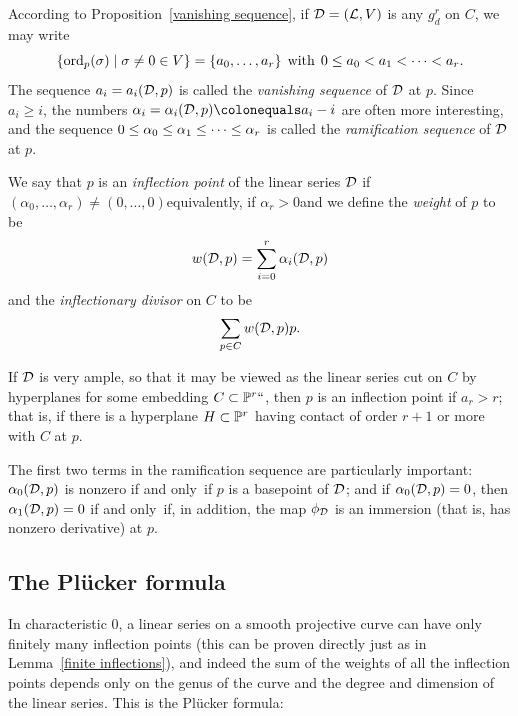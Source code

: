 According to  Proposition~\ref{vanishing sequence}, if ${\mathcal D} = ({\mathcal L}, V)$
is any $g^r_d$ on $C$, we may write
$$
\{ \ord_p(\sigma) \mid \sigma \neq 0 \in V \} = \{a_0,\dots,a_r\} \;
\text{ with } \; 0\leq a_0 < a_1 < \dots < a_r.
$$
The sequence $a_i = a_i({\mathcal D},p)$ is called the
%
\emph{vanishing sequence} of ${\mathcal D}$ at $p$.  Since $a_i \geq i$,
the numbers
$\alpha_i = \alpha_i(\cD,p) \colonequals  a_i - i$ are often more
interesting,
and the sequence $0 \leq \alpha_0 \leq \alpha_1 \leq \dots \leq
\index{ramification sequence|defi}%
\alpha_r$ is called the \emph{ramification sequence} of ${\mathcal D}$ at $p$.

We say that $p$ is an \emph{inflection point} of the linear series ${\mathcal D}$
if $(\alpha_0,\dots,\alpha_r) \neq (0,\dots,0)$\emdash equivalently,
if $\alpha_r > 0$\emdash and we define the \emph{weight} of $p$ to be
%
$$
w({\mathcal D}, p) = \sum_{i=0}^r \alpha_i({\mathcal D}, p)
$$
and the 
\emph{inflectionary divisor}
%
%
 on $C$ to be 
$$
\sum_{p\in C}w({\mathcal D}, p)p.
$$

If ${\mathcal D}$ is very ample, so that it may be viewed as the linear series cut
on $C$ by hyperplanes for some embedding $C \subset \mathbb P^r` `$, then $p$
is an inflection point if $a_r > r$; that is, if there is a hyperplane
$H \subset \mathbb P^r$ having contact of order $r+1$ or more with $C$ at $p$.

The first two terms in the ramification sequence are particularly
important: $\alpha_0({\mathcal D}, p)$ is nonzero if and only~if $p$ is a basepoint
of ${\mathcal D}$; and if $\alpha_0({\mathcal D}, p)=0$, then $\alpha_1({\mathcal D}, p) = 0$ if
and only~if, in addition, the map $\phi_{\mathcal D}$ is an 
immersion
%
(that is,
has nonzero derivative) at $p$.

\subsection*{The Pl\"ucker formula}

In characteristic 0, a linear series on a smooth projective curve can
%
have only finitely many inflection points (this can be proven
directly just as in Lemma~\ref{finite inflections}), and indeed the
sum of the weights of all the inflection points depends only on the
genus of the curve and the degree and dimension 
of the linear
series. This is the Pl\"ucker formula:

